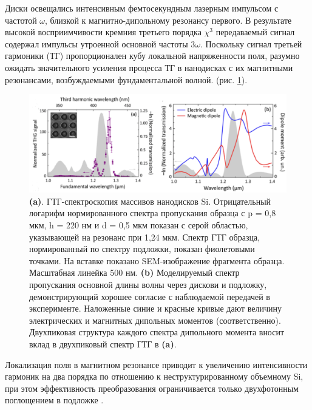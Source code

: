 Диски освещались интенсивным фемтосекундным лазерным импульсом с частотой $\omega$, близкой к магнитно-дипольному резонансу первого. В результате высокой восприимчивости кремния третьего порядка $\chi^3$ передаваемый сигнал содержал импульсы утроенной основной частоты $3\omega$. Поскольку сигнал третьей гармоники (ТГ) пропорционален кубу локальной напряженности поля, разумно ожидать значительного усиления процесса ТГ в нанодисках с их магнитными резонансами, возбуждаемыми фундаментальной волной. (рис. \ref{nonliner:nanodisks}). 
\begin{figure}[h!]
    \centering
	\includegraphics[width=0.8\linewidth]{images/fig3.png}
	\caption{\textbf{(a)}. ГТГ-спектроскопия массивов нанодисков Si. Отрицательный логарифм нормированного спектра пропускания образца с p = 0,8 мкм, h = 220 нм и d = 0,5 мкм показан с серой областью, указывающей на резонанс при 1,24 мкм. Спектр ГТГ образца, нормированный по спектру подложки, показан фиолетовыми точками. На вставке показано SEM-изображение фрагмента образца. Масштабная линейка  500 нм. \textbf{(b)} Моделируемый спектр пропускания основной длины волны через дискови и подложку, демонстрирующий хорошее согласие с наблюдаемой передачей в эксперименте. Наложенные синие и красные кривые дают величину электрических и магнитных дипольных моментов (соответственно). Двухпиковая структура каждого спектра дипольного момента вносит вклад в двухпиковый спектр ГТГ в\textbf{ (a)}.}
	\label{nonliner:nanodisks}
\end{figure}
\hspace*{2mm}
Локализация поля в магнитном резонансе приводит к увеличению интенсивности гармоник на два порядка по отношению к неструктурированному объемному Si, при этом эффективность преобразования ограничивается только двухфотонным поглощением в подложке \cite{shcherbakov2014enhanced}. 


